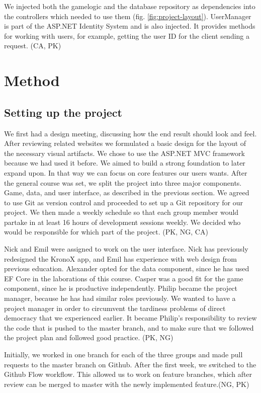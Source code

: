 \documentclass[acmlarge, review=false, screen=true]{acmart}
\begin{document}
We injected both the gamelogic and the database repository as dependencies into the controllers which needed to use them (fig. \ref{fig:project-layout}). UserManager is part of the ASP.NET Identity System and is also injected. It provides methods for working with users, for example, getting the user ID for the client sending a request. (CA, PK)



\section{Method}
  \subsection{Setting up the project}
    We first had a design meeting, discussing how the end result should look and feel. After reviewing related websites we formulated a basic design for the layout of the necessary visual artifacts. We chose to use the ASP.NET MVC framework because we had used it before. We aimed to build a strong foundation to later expand upon. In that way we can focus on core features our users wants. After the general course was set, we split the project into three major components. Game, data, and user interface, as described in the previous section. We agreed to use Git as version control and proceeded to set up a Git repository for our project. We then made a weekly schedule so that each group member would partake in at least 16 hours of development sessions weekly. We decided who would be responsible for which part of the project. (PK, NG, CA)

    Nick and Emil were assigned to work on the user interface. Nick has previously redesigned the KronoX app, and Emil has experience with web design from previous education\cite{nick}. Alexander opted for the data component, since he has used EF Core in the laborations of this course. Casper was a good fit for the game component, since he is productive independently. Philip became the project manager, because he has had similar roles previously. We wanted to have a project manager in order to circumvent the tardiness problems of direct democracy that we experienced earlier. It became Philip’s responsibility to review the code that is pushed to the master branch, and to make sure that we followed the project plan and followed good practice. (PK, NG)

    Initially, we worked in one branch for each of the three groups and made pull requests to the master branch on Github. After the first week, we switched to the Github Flow workflow\cite{githubflow}. This allowed us to work on feature branches, which after review can be merged to master with the newly implemented feature.(NG, PK)
\end{document}
